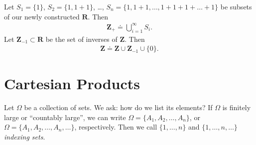 \begin{definition}
	Let $S_{1} = \{1\}$,
	$S_{2} = \{1, 1+1\}$, \dots, $S_{n} = \{1, 1+1, \dots, 1+1+1+\dots+1\}$
	be subsets of our newly constructed $\mathbf{R}$. Then
	\begin{equation*}
		\begin{split}
			\mathbf{Z}_{+} \doteq \bigcup_{i=1}^{\infty} S_{i}.
		\end{split}
	\end{equation*}
	Let $\mathbf{Z}_{-1} \subset \mathbf{R}$ be the set of inverses of $\mathbf{Z}$. Then
	\begin{equation*}
		\begin{split}
			\mathbf{Z} \doteq \mathbf{Z} \cup \mathbf{Z}_{-1} \cup \{0\}.
		\end{split}
	\end{equation*}
\end{definition}
\begin{definition}[Induction]
\end{definition}
\section{Cartesian Products}
Let $\Omega$ be a collection of sets. We ask: how do we list its elements?
If $\Omega$ is finitely large or ``countably large'', we can write
$\Omega = \{ A_{1}, A_{2}, \dots, A_{n}\}$, or
$\Omega = \{ A_{1}, A_{2}, \dots, A_{n}, \dots\}$, respectively.
Then we call $\{ 1,\dots, n\}$ and $\{1, \dots, n, \dots\}$ \emph{indexing
sets}.

